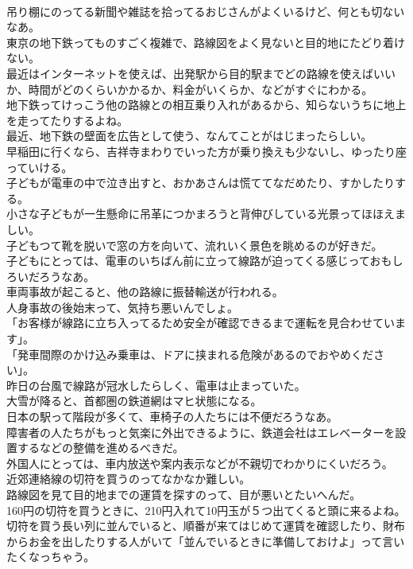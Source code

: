 \documentclass[8pt]{extreport}
\begin{document}
\begin{CJK}{UTF8}{min}
\\	吊り棚にのってる新聞や雑誌を拾ってるおじさんがよくいるけど、何とも切ないなあ。	
\\	東京の地下鉄ってものすごく複雑で、路線図をよく見ないと目的地にたどり着けない。	
\\	最近はインターネットを使えば、出発駅から目的駅までどの路線を使えばいいか、時間がどのくらいかかるか、料金がいくらか、などがすぐにわかる。	
\\	地下鉄ってけっこう他の路線との相互乗り入れがあるから、知らないうちに地上を走ってたりするよね。	
\\	最近、地下鉄の壁面を広告として使う、なんてことがはじまったらしい。	
\\	早稲田に行くなら、吉祥寺まわりでいった方が乗り換えも少ないし、ゆったり座っていける。	
\\	子どもが電車の中で泣き出すと、おかあさんは慌ててなだめたり、すかしたりする。	
\\	小さな子どもが一生懸命に吊革につかまろうと背伸びしている光景ってほほえましい。	
\\	子どもつて靴を脱いで窓の方を向いて、流れいく景色を眺めるのが好きだ。	
\\	子どもにとっては、電車のいちばん前に立って線路が迫ってくる感じっておもしろいだろうなあ。	
\\	車両事故が起こると、他の路線に振替輸送が行われる。	
\\	人身事故の後始末って、気持ち悪いんでしょ。	
\\	「お客様が線路に立ち入ってるため安全が確認できるまで運転を見合わせています」。	
\\	「発車間際のかけ込み乗車は、ドアに挟まれる危険があるのでおやめください」。	
\\	昨日の台風で線路が冠水したらしく、電車は止まっていた。	
\\	大雪が降ると、首都圏の鉄道網はマヒ状態になる。	
\\	日本の駅って階段が多くて、車椅子の人たちには不便だろうなあ。	
\\	障害者の人たちがもっと気楽に外出できるように、鉄道会社はエレベーターを設置するなどの整備を進めるべきだ。	
\\	外国人にとっては、車内放送や案内表示などが不親切でわかりにくいだろう。	
\\	近郊連絡線の切符を買うのってなかなか難しい。	
\\	路線図を見て目的地までの運賃を探すのって、目が悪いとたいへんだ。	
\\	160円の切符を買うときに、210円入れて10円玉が５つ出てくると頭に来るよね。	
\\	切符を買う長い列に並んでいると、順番が来てはじめて運賃を確認したり、財布からお金を出したりする人がいて「並んでいるときに準備しておけよ」って言いたくなっちゃう。	

\end{CJK}
\end{document}
